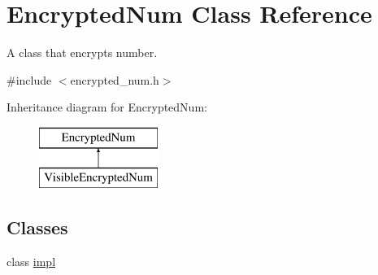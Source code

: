 \hypertarget{class_encrypted_num}{}\section{Encrypted\+Num Class Reference}
\label{class_encrypted_num}


A class that encrypts number.  




{\ttfamily \#include $<$encrypted\+\_\+num.\+h$>$}

Inheritance diagram for Encrypted\+Num\+:\begin{figure}[H]
\begin{center}
\leavevmode
\includegraphics[height=2.000000cm]{class_encrypted_num}
\end{center}
\end{figure}
\subsection*{Classes}
\begin{DoxyCompactItemize}
\item 
class \mbox{\hyperlink{class_encrypted_num_1_1impl}{impl}}
\end{DoxyCompactItemize}
